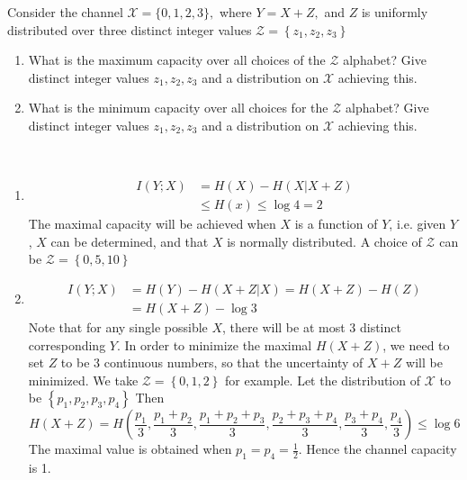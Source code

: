 \begin{exercise}{Consider the channel $\mathcal{X}=\{0,1,2,3\},$ where $Y=X+Z,$ and $Z$ is uniformly distributed over three distinct integer values $\mathcal{Z}=\left\{z_{1}, z_{2}, z_{3}\right\}$
  \begin{enumerate}
    \item What is the maximum capacity over all choices of the $\mathcal{Z}$ alphabet? Give distinct integer values $z_{1}, z_{2}, z_{3}$ and a distribution on     $\mathcal{X}$ achieving this.
    \item What is the minimum capacity over all choices for the $\mathcal{Z}$ alphabet? Give distinct integer values $z_{1}, z_{2}, z_{3}$ and a distribution on
    $\mathcal{X}$ achieving this.
  \end{enumerate} }
  \begin{solution}
  \par{~}
  \begin{enumerate}
    \item { 
    \begin{equation}
      \begin{aligned}
        I(Y;X) &= H(X) - H(X|X+Z) \\
        &\le H(x)  \le \log 4 = 2
      \end{aligned}
    \end{equation}  
    The maximal capacity will be achieved when $X$ is a function of $Y$, i.e. given $Y$, $X$ can be determined, and that $X$ is normally distributed. A choice of $\mathcal{Z}$ can be $\mathcal{Z}=\left\{0, 5, 10 \right\}$ }
    \item {
      \begin{equation}
        \begin{aligned}
          I(Y;X) &= H(Y) - H(X+Z|X) = H(X+Z) - H(Z) \\
          &= H(X+Z) - \log 3 
        \end{aligned}
      \end{equation}
      Note that for any single possible $X$, there will be at most 3 distinct corresponding $Y$. In order to minimize the maximal $H(X+Z)$, we need to set $Z$ to be 3 continuous numbers, so that the uncertainty of $X+Z$ will be minimized. We take $\mathcal{Z}=\left\{0, 1, 2 \right\}$ for example. Let the distribution of $\mathcal{X}$ to be $\left\{p_1, p_2, p_3,p_4 \right\}$ Then
      \begin{equation}
          H(X+Z) = H(\frac{p_1}{3}, \frac{p_1 + p_2}{3}, \frac{p_1+p_2+p_3}{3}, \frac{p_2+p_3+p_4}{3}, \frac{p_3+p_4}{3}, \frac{p_4}{3}) \le \log 6
      \end{equation}
      The maximal value is obtained when $p_1 = p_4 =  \frac{1}{2}$. Hence the channel capacity is 1.
     }
  \end{enumerate}
  \end{solution}
  \label{ex7-4}
\end{exercise}

